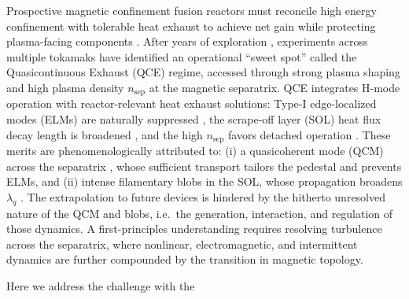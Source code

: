 \documentclass[aps,prl,twocolumn,superscriptaddress]{revtex4-2}
\def  \nsep {n_\mathrm{sep}}
\begin{document}
Prospective magnetic confinement fusion reactors must reconcile high energy confinement with tolerable heat exhaust to achieve net gain while protecting plasma-facing components \cite{siccinio2020demo}.
After years of exploration \cite{Viezzer2018}, experiments across multiple tokamaks \cite{harrerParameterDependencesSmall2018,labit2019dependence,faitsch2025quasi} have identified an operational “sweet spot” called the Quasicontinuous Exhaust (QCE) regime, accessed \cite{dunne2024quasi,faitsch2023analysis} through strong plasma shaping and high plasma density $\nsep$ at the magnetic separatrix.
QCE integrates H-mode \cite{wagner1982regime} operation with reactor-relevant heat exhaust solutions: Type-I edge-localized modes (ELMs) \cite{zohm1996edge} are naturally suppressed \cite{harrerParameterDependencesSmall2018}, the scrape-off layer (SOL) heat flux decay length \cite{Eich2013} is broadened \cite{faitsch2021broadening}, and the high $\nsep$ favors detached operation \cite{wischmeier2015high}.
These merits are phenomenologically attributed to: (i) a quasicoherent mode (QCM) across the separatrix \cite{mazurenko2002experimental,kalis2023experimental,terry2005transport}, whose sufficient transport tailors the pedestal and prevents ELMs, and (ii) intense filamentary blobs \cite{d2011convective} in the SOL, whose propagation broadens $\lambda_q$ \cite{faitsch2021broadening}.
The extrapolation to future devices is hindered by the hitherto unresolved nature of the QCM and blobs, i.e.~the generation, interaction, and regulation of those dynamics.
A first-principles understanding requires resolving turbulence across the separatrix, where nonlinear, electromagnetic, and intermittent dynamics are further compounded by {the transition in magnetic topology.}


Here we address the challenge with the
\end{document}
